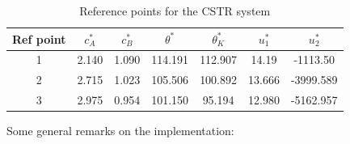 \documentclass[12pt]{article}
\begin{document}
\begin{table}%
	\centering
	\begin{tabular}{|c|c|c|c|c|c|c|}
		\hline
		Ref point & $c_A^*$ & $c_B^*$ & $\theta^*$ & $\theta_K^*$ & $u_1^*$ & $u_2^*$ \\
		\hline
		1 & 2.140 & 1.090 & 114.191 & 112.907 & 14.19 & -1113.50 \\
		\hline
		2 & 2.715 & 1.023 & 105.506 & 100.892 & 13.666 & -3999.589 \\
		\hline
		3 & 2.975 &  0.954 & 101.150 & 95.194 & 12.980 & -5162.957 \\
		\hline
	\end{tabular}
	\caption{Reference points for the CSTR system}
	\label{tab:CSTR-ref-points}
\end{table}

\noindent Some general remarks on the implementation:
\end{document}
